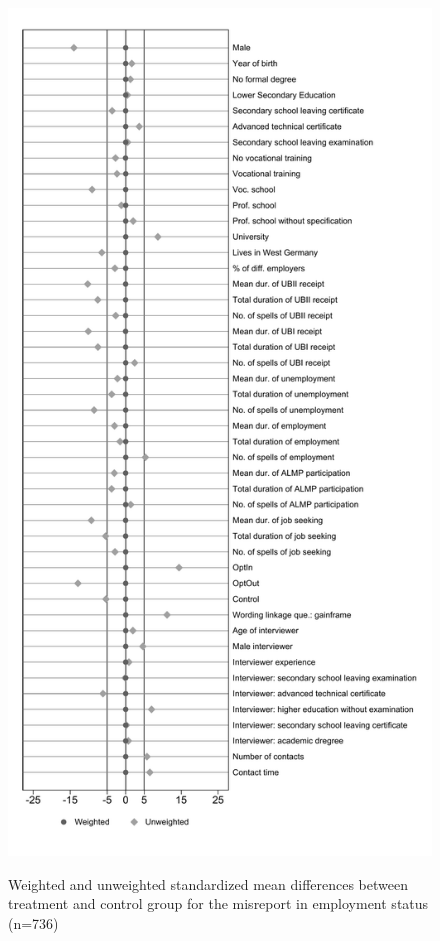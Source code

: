 \newpage
\begin{figure}[b]
\caption{Weighted and unweighted standardized mean differences between treatment and control group for the misreport in employment status (n=736)}
\centering
\includegraphics[scale=0.4]{balance.pdf}
\label{fig:balance}
\end{figure}

